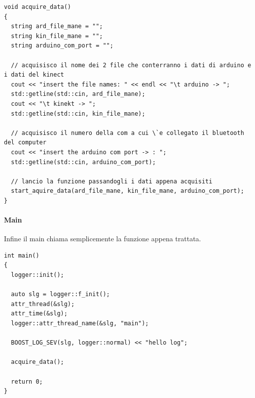 \documentclass[10pt,a4paper]{article}
\begin{document}
\begin{lstlisting}[style=mycpp, caption=librerie usate, captionpos=b]
void acquire_data()
{
  string ard_file_mane = "";
  string kin_file_mane = "";
  string arduino_com_port = "";

  // acquisisco il nome dei 2 file che conterranno i dati di arduino e i dati del kinect
  cout << "insert the file names: " << endl << "\t arduino -> ";
  std::getline(std::cin, ard_file_mane);
  cout << "\t kinekt -> ";
  std::getline(std::cin, kin_file_mane);

  // acquisisco il numero della com a cui \`e collegato il bluetooth del computer 
  cout << "insert the arduino com port -> : ";
  std::getline(std::cin, arduino_com_port);

  // lancio la funzione passandogli i dati appena acquisiti
  start_aquire_data(ard_file_mane, kin_file_mane, arduino_com_port);
}
\end{lstlisting}
%
%
\paragraph{Main}
Infine il main chiama semplicemente la funzione appena trattata.
\begin{lstlisting}[style=mycpp, caption=librerie usate, captionpos=b]
int main()
{
  logger::init();

  auto slg = logger::f_init();
  attr_thread(&slg);
  attr_time(&slg);
  logger::attr_thread_name(&slg, "main");

  BOOST_LOG_SEV(slg, logger::normal) << "hello log";

  acquire_data();

  return 0;
}
\end{lstlisting}
\end{document}
